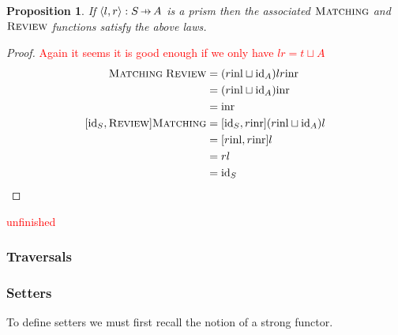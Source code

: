 \documentclass[11pt,a4paper]{article}
\theoremstyle{plain}
\newtheorem{proposition}[theorem]{Proposition}
\theoremstyle{definition}
\newcommand{\id}{\mathrm{id}}
\newcommand{\inl}{\mathrm{inl}}
\newcommand{\inr}{\mathrm{inr}}
\newcommand{\freview}{\textsc{Review}}
\newcommand{\fmatching}{\textsc{Matching}}
\newcommand{\hto}{\ensuremath{\,\mathaccent\shortmid\rightarrow\,}}
\newcommand{\todo}[1]{\textcolor{red}{\small #1}}
\begin{document}
\begin{proposition}
\label{prop-OpticImpliesPrismLaws}
If $\langle l, r \rangle : S \hto A$ is a prism then the associated $\fmatching$ and $\freview$ functions satisfy the above laws.
\end{proposition}
\begin{proof}
\todo{Again it seems it is good enough if we only have $lr = t \sqcup A$}
\begin{align*}
\fmatching \; \freview 
&= (r\inl \sqcup \id_A)l r \inr \\
&= (r\inl \sqcup \id_A) \inr \\
&= \inr \\
[\id_S, \freview] \fmatching
&= [\id_S, r \inr] (r\inl \sqcup \id_A)l \\ 
&= [r\inl, r \inr] l \\ 
&= rl \\
&= \id_S
\end{align*}
\end{proof}

\todo{unfinished}

\subsubsection{Traversals}
\subsubsection{Setters}

To define setters we must first recall the notion of a strong functor.
\end{document}
